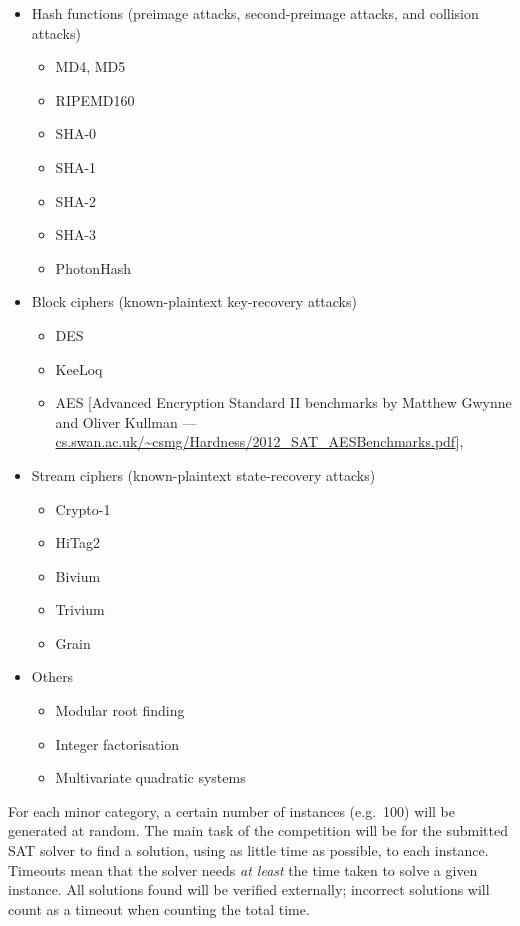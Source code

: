 \documentclass[12pt, a4paper]{article}
\begin{document}
\begin{itemize}
\item Hash functions (preimage attacks, second-preimage attacks, and collision attacks)
\begin{itemize}
\item MD4, MD5~\cite{Jova2005, Miro2006, De2007}
\item RIPEMD160
\item SHA-0~\cite{Miro2006}
\item SHA-1~\cite{Mora2010}
\item SHA-2
\item SHA-3~\cite{Mora2010}
\item PhotonHash
\end{itemize}

\item Block ciphers (known-plaintext key-recovery attacks)
\begin{itemize}
\item DES~\cite{Massacci2000, Courtois2007}
\item KeeLoq~\cite{Cour2008}
\item AES [Advanced Encryption Standard II benchmarks by Matthew Gwynne and Oliver Kullman --- \url{cs.swan.ac.uk/~csmg/Hardness/2012_SAT_AESBenchmarks.pdf}], \cite{DBLP:conf/ches/RenauldSV09}
\end{itemize}

\item Stream ciphers (known-plaintext state-recovery attacks)
\begin{itemize}
\item Crypto-1~\cite{Soos2009}
\item HiTag2~\cite{Soos2009}
\item Bivium~\cite{Soos2009, McDonald2010}
\item Trivium~\cite{Soos2009, McDonald2010}
\item Grain~\cite{Soos2010}
\end{itemize}

\item Others
\begin{itemize}
\item Modular root finding~\cite{Fiorini2003}
\item Integer factorisation~\cite{Sreb2007}
\item Multivariate quadratic systems~\cite{Bard2007}
\end{itemize}
\end{itemize}

For each minor category, a certain number of instances (e.g.\ 100) will be generated at random. The main task of the competition will be for the submitted SAT solver to find a solution, using as little time as possible, to each instance. Timeouts mean that the solver needs \emph{at least} the time taken to solve a given instance. All solutions found will be verified externally; incorrect solutions will count as a timeout when counting the total time.
\end{document}
